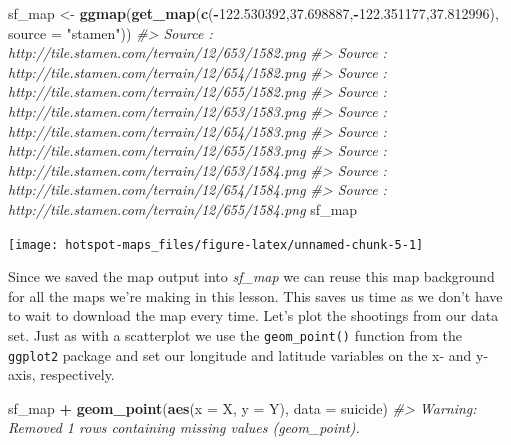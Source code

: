 \documentclass[
  12pt,
]{book}
\newenvironment{Shaded}{\begin{snugshade}}{\end{snugshade}}
\newcommand{\CommentTok}[1]{\textcolor[rgb]{0.56,0.35,0.01}{\textit{#1}}}
\newcommand{\DataTypeTok}[1]{\textcolor[rgb]{0.13,0.29,0.53}{#1}}
\newcommand{\FloatTok}[1]{\textcolor[rgb]{0.00,0.00,0.81}{#1}}
\newcommand{\KeywordTok}[1]{\textcolor[rgb]{0.13,0.29,0.53}{\textbf{#1}}}
\newcommand{\NormalTok}[1]{#1}
\newcommand{\OperatorTok}[1]{\textcolor[rgb]{0.81,0.36,0.00}{\textbf{#1}}}
\newcommand{\StringTok}[1]{\textcolor[rgb]{0.31,0.60,0.02}{#1}}
\begin{document}
\begin{Shaded}
\begin{Highlighting}[]
\NormalTok{sf\_map <{-}}\StringTok{ }\KeywordTok{ggmap}\NormalTok{(}\KeywordTok{get\_map}\NormalTok{(}\KeywordTok{c}\NormalTok{(}\OperatorTok{{-}}\FloatTok{122.530392}\NormalTok{,}\FloatTok{37.698887}\NormalTok{,}\OperatorTok{{-}}\FloatTok{122.351177}\NormalTok{,}\FloatTok{37.812996}\NormalTok{), }
                            \DataTypeTok{source =} \StringTok{"stamen"}\NormalTok{))}
\CommentTok{\#> Source : http://tile.stamen.com/terrain/12/653/1582.png}
\CommentTok{\#> Source : http://tile.stamen.com/terrain/12/654/1582.png}
\CommentTok{\#> Source : http://tile.stamen.com/terrain/12/655/1582.png}
\CommentTok{\#> Source : http://tile.stamen.com/terrain/12/653/1583.png}
\CommentTok{\#> Source : http://tile.stamen.com/terrain/12/654/1583.png}
\CommentTok{\#> Source : http://tile.stamen.com/terrain/12/655/1583.png}
\CommentTok{\#> Source : http://tile.stamen.com/terrain/12/653/1584.png}
\CommentTok{\#> Source : http://tile.stamen.com/terrain/12/654/1584.png}
\CommentTok{\#> Source : http://tile.stamen.com/terrain/12/655/1584.png}
\NormalTok{sf\_map}
\end{Highlighting}
\end{Shaded}

\begin{center}\texttt{[image: hotspot-maps\_files/figure-latex/unnamed-chunk-5-1]} \end{center}

Since we saved the map output into \emph{sf\_map} we can reuse this map background for all the maps we're making in this lesson. This saves us time as we don't have to wait to download the map every time. Let's plot the shootings from our data set. Just as with a scatterplot we use the \texttt{geom\_point()} function from the \texttt{ggplot2} package and set our longitude and latitude variables on the x- and y-axis, respectively.

\begin{Shaded}
\begin{Highlighting}[]
\NormalTok{sf\_map }\OperatorTok{+}
\StringTok{  }\KeywordTok{geom\_point}\NormalTok{(}\KeywordTok{aes}\NormalTok{(}\DataTypeTok{x =}\NormalTok{ X, }\DataTypeTok{y =}\NormalTok{ Y),}
             \DataTypeTok{data  =}\NormalTok{ suicide)}
\CommentTok{\#> Warning: Removed 1 rows containing missing values (geom\_point).}
\end{Highlighting}
\end{Shaded}
\end{document}
